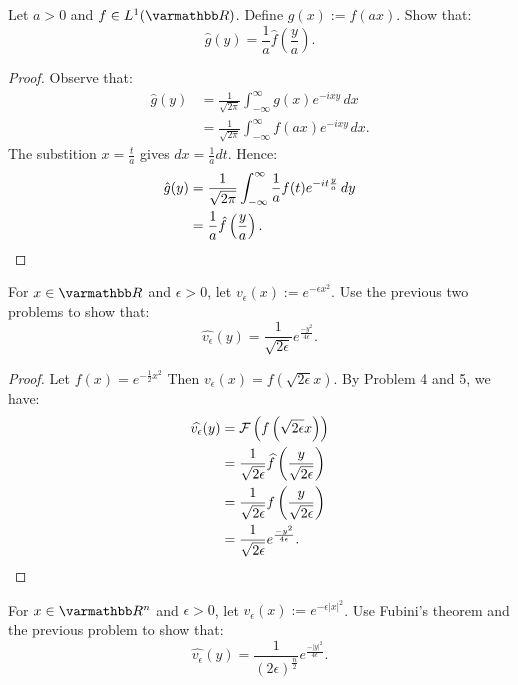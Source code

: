 \documentclass[10pt,oneside,openany]{memoir}
\begin{document}
\begin{problem}
	Let $a > 0$ and $f \in L^1(\bfR)$. Define $g(x) := f(ax)$. Show that:
	\[
		\hat{g}(y) = \frac{1}{a}\hat{f}\left( \frac{y}{a} \right).
	\] 
\end{problem}
	\begin{proof}
		Observe that:
		\begin{align*}
			\hat{g}(y)
			&= \frac{1}{\sqrt{2\pi}} \int_{-\infty}^{\infty} g(x)e^{-ixy}\,dx \\
			&= \frac{1}{\sqrt{2\pi}} \int_{-\infty}^{\infty} f(ax)e^{-ixy\,}dx.
		\end{align*}
		The substition $x = \frac{t}{a}$ gives $dx = \frac{1}{a}dt$. Hence:
		\begin{align*}
			\hat{g}(y)
			&= \frac{1}{\sqrt{2\pi}} \int_{-\infty}^{\infty} \frac{1}{a}f(t)e^{-it \frac{y}{a}}\,dy \\
			&= \frac{1}{a}\hat{f}\left( \frac{y}{a} \right). \qedhere
		\end{align*}
	\end{proof}
\begin{problem}
	For $x \in \bfR$ and $\epsilon > 0$, let $v_\epsilon(x) := e^{-\epsilon x^2}$. Use the previous two problems to show that:
	\[
		\widehat{v_\epsilon}(y) = \frac{1}{\sqrt{2\epsilon}}e^{\frac{-y^2}{4\epsilon}}.
	\]	
\end{problem}
	\begin{proof}
		Let $f(x) = e^{-\frac{1}{2}x^2}$ Then $v_\epsilon(x) = f\left(\sqrt{2\epsilon}x\right)$. By Problem 4 and 5, we have: 
		\begin{align*}
			\widehat{v_\epsilon}(y) 
			&= \mathcal{F}\left(f\left(\sqrt{2\epsilon}x\right)\right) \\
			&= \frac{1}{\sqrt{2 \epsilon}} \widehat{f}\left( \frac{y}{\sqrt{2\epsilon}} \right) \\
			&= \frac{1}{\sqrt{2 \epsilon}} f\left( \frac{y}{\sqrt{2\epsilon}} \right) \\
			&= \frac{1}{\sqrt{2\epsilon}}e^{\frac{-y^2}{4 \epsilon}}. \qedhere
		\end{align*}
	\end{proof}
\begin{problem}
	For $x \in \bfR^n$ and $\epsilon > 0$, let $v_\epsilon(x) := e^{- \epsilon|x|^2}$. Use Fubini's theorem and the previous problem to show that:
	\[
		\widehat{v_\epsilon}(y) = \frac{1}{(2\epsilon)^{\frac{n}{2}}}e^{\frac{-|y|^2}{4\epsilon}}.
	\]
\end{problem}
\end{document}
